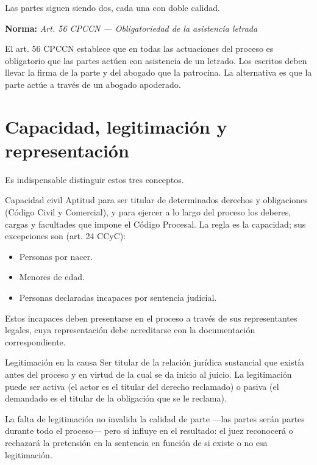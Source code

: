 \documentclass[12pt,oneside]{book}
\newcommand{\norma}[1]{%
\par\noindent\textbf{Norma:} \textit{#1}\par\smallskip
}
\begin{document}
Las partes siguen siendo dos, cada una con doble calidad.

\norma{Art. 56 CPCCN --- Obligatoriedad de la asistencia letrada}

\begin{note}
El art. 56 CPCCN establece que en todas las actuaciones del proceso es obligatorio que las partes actúen con asistencia de un letrado. Los escritos deben llevar la firma de la parte y del abogado que la patrocina. La alternativa es que la parte actúe a través de un abogado apoderado.
\end{note}

\section{Capacidad, legitimación y representación}

Es indispensable distinguir estos tres conceptos.

\begin{definition}{Capacidad civil}
Aptitud para ser titular de determinados derechos y obligaciones (Código Civil y Comercial), y para ejercer a lo largo del proceso los deberes, cargas y facultades que impone el Código Procesal. La regla es la capacidad; sus excepciones son (art. 24 CCyC):
\begin{itemize}
    \item Personas por nacer.
    \item Menores de edad.
    \item Personas declaradas incapaces por sentencia judicial.
\end{itemize}
Estos incapaces deben presentarse en el proceso a través de sus representantes legales, cuya representación debe acreditarse con la documentación correspondiente.
\end{definition}

\begin{definition}{Legitimación en la causa}
Ser titular de la relación jurídica sustancial que existía antes del proceso y en virtud de la cual se da inicio al juicio. La legitimación puede ser activa (el actor es el titular del derecho reclamado) o pasiva (el demandado es el titular de la obligación que se le reclama).
\end{definition}

\begin{important}
La falta de legitimación no invalida la calidad de parte —las partes serán partes durante todo el proceso— pero sí influye en el resultado: el juez reconocerá o rechazará la pretensión en la sentencia en función de si existe o no esa legitimación.
\end{important}
\end{document}
